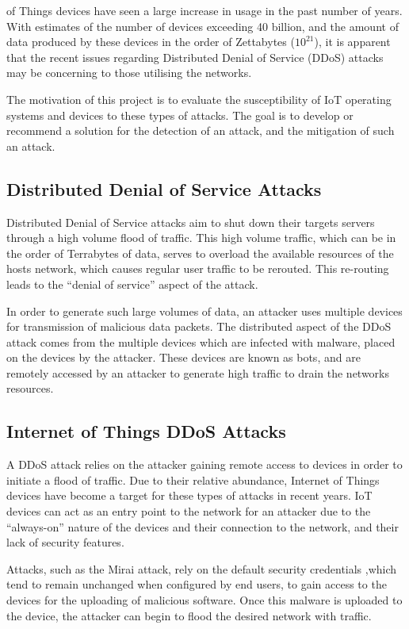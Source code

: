  of Things devices have seen a large increase in usage
in the past number of years. With estimates of the number of devices exceeding
40 billion\cite{idc_2019}, and the amount of data produced by these devices in the order
of Zettabytes\cite{idc_2019} ($10^{21}$), it is apparent that the recent issues
regarding Distributed Denial of Service (DDoS) attacks may be concerning to
those utilising the networks.

The motivation of this project is to evaluate the susceptibility of IoT
operating systems and devices to these types of attacks. The goal is to develop
or recommend a solution for the detection of an attack, and the mitigation of
such an attack.

\subsection{Distributed Denial of Service Attacks}

Distributed Denial of Service attacks aim to shut down their targets servers
through a high volume flood of traffic. This high volume traffic, which can be
in the order of Terrabytes of data, serves to overload the available resources
of the hosts network, which causes regular user traffic to be rerouted. This
re-routing leads to the ``denial of service'' aspect of the attack.

In order to generate such large volumes of data, an attacker uses multiple
devices for transmission of malicious data packets. The distributed aspect of
the DDoS attack comes from the multiple devices which are infected with
malware, placed on the devices by the attacker. These devices are known as bots, and
are remotely accessed by an attacker to generate high traffic to drain the
networks resources.

\subsection{Internet of Things DDoS Attacks}

A DDoS attack relies on the attacker gaining remote access to devices in order
to initiate a flood of traffic. Due to their relative abundance, Internet of
Things devices have become a target for these types of attacks in recent years.
IoT devices can act as an entry point to the network for an attacker due to the
``always-on'' nature of the devices and their connection to the network, and
their lack of security features.

Attacks, such as the Mirai attack, rely on the default security credentials
,which tend to remain unchanged when configured by end users, to gain access to
the devices for the uploading of malicious software. Once this
malware is uploaded to the device, the attacker can begin to flood the desired
network with traffic\cite{7971869}.

